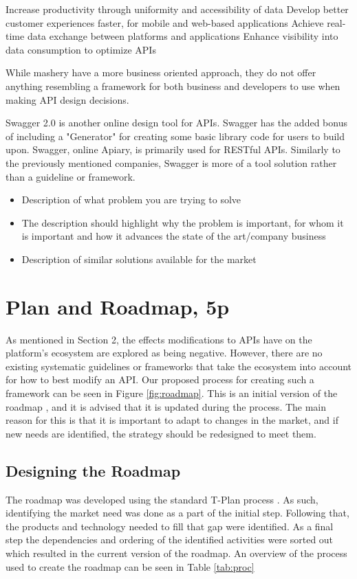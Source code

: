 \documentclass{article}
\begin{document}
Increase productivity through uniformity and accessibility of data
Develop better customer experiences faster, for mobile and web-based applications
Achieve real-time data exchange between platforms and applications
Enhance visibility into data consumption to optimize APIs

While mashery have a more business oriented approach, they do not offer anything resembling a framework for both business and developers to use when making API design decisions.

Swagger 2.0 is another online design tool for APIs. Swagger has the added bonus of including a "Generator" for creating some basic library code for users to build upon. Swagger, online Apiary, is primarily used for RESTful APIs. Similarly to the previously mentioned companies, Swagger is more of a tool solution rather than a guideline or framework.






\begin{itemize}
	\item Description of what problem you are trying to solve
	\item The description should highlight why the problem is important, for whom it is important and how it advances the state of the art/company business
	\item Description of similar solutions available for the market
\end{itemize}





\section{Plan and Roadmap, 5p}
As mentioned in Section 2, the effects modifications to APIs have on the platform’s ecosystem are explored as being negative. However, there are no existing systematic guidelines or frameworks that take the ecosystem into account for how to best modify an API. Our proposed process for creating such a framework can be seen in Figure \ref{fig:roadmap}. This is an initial version of the roadmap \cite{!!!roadmap}, and it is advised that it is updated during the process. The main reason for this is that it is important to adapt to changes in the market, and if new needs are identified, the strategy should be redesigned to meet them. 

\subsection{Designing the Roadmap}
The roadmap was developed using the standard T-Plan process \cite{!!!roadmap}. As such, identifying the market need was done as a part of the initial step. Following that, the products and technology needed to fill that gap were identified. As a final step the dependencies and ordering of the identified activities were sorted out which resulted in the current version of the roadmap. An overview of the process used to create the roadmap can be seen in Table \ref{tab:proc}
\end{document}
